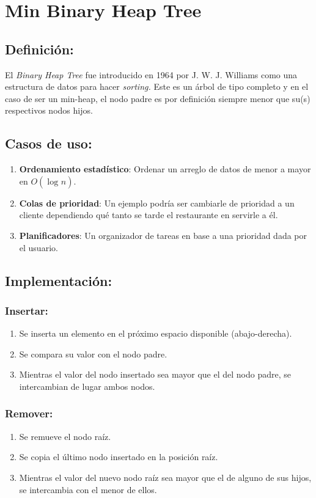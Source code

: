 \documentclass[]{article}
\begin{document}
\section{Min Binary Heap Tree}
	\subsection{Definición:}
		\par El \textit{Binary Heap Tree} fue introducido en 1964 por J. W. J. Williams como una estructura de datos para hacer \emph{sorting.}\cite{forsytheAlgorithms1964} Este es un árbol de tipo completo y en el caso de ser un min-heap, el nodo padre es por definición siempre menor que su(s) respectivos nodos hijos. 
	\subsection{Casos de uso:}
		\begin{enumerate}
			\item \textbf{Ordenamiento estadístico}: Ordenar un arreglo de datos de menor a mayor en $O(\log_{}n)$.
			\item \textbf{Colas de prioridad}: Un ejemplo podría ser cambiarle de prioridad a un cliente dependiendo qué tanto se tarde el restaurante en servirle a él.
			\item \textbf{Planificadores}: Un organizador de tareas en base a una prioridad dada por el usuario.
		\end{enumerate}
	\subsection{Implementación:}
		\subsubsection{Insertar:}
			\begin{enumerate}
				\item Se inserta un elemento en el próximo espacio disponible (abajo-derecha).
				\item Se compara su valor con el nodo padre.
				\item Mientras el valor del nodo insertado sea mayor que el del nodo padre, se intercambian de lugar ambos nodos.
			\end{enumerate}
		\subsubsection{Remover:}
			\begin{enumerate}
				\item Se remueve el nodo raíz.
				\item Se copia el último nodo insertado en la posición raíz.
				\item Mientras el valor del nuevo nodo raíz sea mayor que el de alguno de sus hijos, se intercambia con el menor de ellos.
			\end{enumerate}
\end{document}

